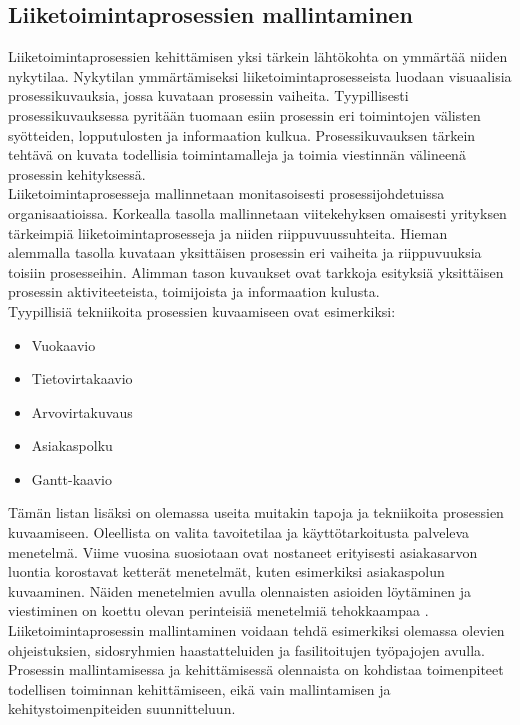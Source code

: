 \documentclass[finnish,12pt,a4paper,pdftex]{article}
\begin{document}
\subsection{Liiketoimintaprosessien mallintaminen}

Liiketoimintaprosessien kehittämisen yksi tärkein lähtökohta on ymmärtää niiden nykytilaa. Nykytilan ymmärtämiseksi liiketoimintaprosesseista luodaan visuaalisia prosessikuvauksia, jossa kuvataan prosessin vaiheita. Tyypillisesti prosessikuvauksessa pyritään tuomaan esiin prosessin eri toimintojen välisten syötteiden, lopputulosten ja informaation kulkua. Prosessikuvauksen tärkein tehtävä on kuvata todellisia toimintamalleja ja toimia viestinnän välineenä prosessin kehityksessä. \citep{ohjelmistotuotanto}\\

Liiketoimintaprosesseja mallinnetaan monitasoisesti prosessijohdetuissa organisaatioissa. Korkealla tasolla mallinnetaan viitekehyksen omaisesti yrityksen tärkeimpiä liiketoimintaprosesseja ja niiden riippuvuussuhteita. Hieman alemmalla tasolla kuvataan yksittäisen prosessin eri vaiheita ja riippuvuuksia toisiin prosesseihin. Alimman tason kuvaukset ovat tarkkoja esityksiä yksittäisen prosessin aktiviteeteista, toimijoista ja informaation kulusta. \citep{teollisuustalous} \\

Tyypillisiä tekniikoita prosessien kuvaamiseen ovat esimerkiksi:

\begin{itemize}
\setlength{\itemsep}{0pt}
    \item Vuokaavio
    \item Tietovirtakaavio
    \item Arvovirtakuvaus
    \item Asiakaspolku
    \item Gantt-kaavio
\end{itemize}

Tämän listan lisäksi on olemassa useita muitakin tapoja ja tekniikoita prosessien kuvaamiseen. Oleellista on valita tavoitetilaa ja käyttötarkoitusta palveleva menetelmä. Viime vuosina suosiotaan ovat nostaneet erityisesti asiakasarvon luontia korostavat ketterät menetelmät, kuten esimerkiksi asiakaspolun kuvaaminen. Näiden menetelmien avulla olennaisten asioiden löytäminen ja viestiminen on koettu olevan perinteisiä menetelmiä tehokkaampaa \citep{lamoureux}. \\

\noindent Liiketoimintaprosessin mallintaminen voidaan tehdä esimerkiksi olemassa olevien ohjeistuksien, sidosryhmien haastatteluiden ja fasilitoitujen työpajojen avulla. Prosessin mallintamisessa ja kehittämisessä olennaista on kohdistaa toimenpiteet todellisen toiminnan kehittämiseen, eikä vain mallintamisen ja kehitystoimenpiteiden suunnitteluun. \citep{ohjelmistotuotanto}\\
\end{document}
